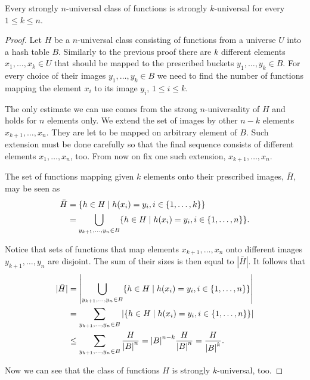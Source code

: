 \begin{remark}
\label{remark-n-to-k}
Every strongly $n$-universal class of functions is strongly $k$-universal for every $1 \leq k \leq n$.
\end{remark}
\begin{proof}
Let $H$ be a $n$-universal class consisting of functions from a universe $U$ into a hash table $B$. Similarly to the previous proof there are $k$ different elements $x_1, \dots, x_k \in U$ that should be mapped to the prescribed buckets $y_1, \dots, y_k \in B$. For every choice of their images $y_1, \dots, y_k \in B$ we need to find the number of functions mapping the element $x_i$ to its image $y_i$, $1 \leq i \leq k$. 

The only estimate we can use comes from the strong $n$-universality of $H$ and holds for $n$ elements only. We extend the set of images by other $n - k$ elements $x_{k + 1}, \dots, x_n$. They are let to be mapped on arbitrary element of $B$. Such extension must be done carefully so that the final sequence consists of different elements $x_1, \dots, x_n$, too. From now on fix one such extension, $x_{k + 1}, \dots, x_n$.

The set of functions mapping given $k$ elements onto their prescribed images, $\bar H$, may be seen as
\[
\begin{split}
\bar{H}	& = \lbrace h \in H \mid h(x_i) = y_i, i \in \lbrace 1, \dots, k \rbrace \rbrace \\
	& = \displaystyle \bigcup_{y_{k+1}, \dots, y_n \in B} \lbrace h \in H \mid h(x_i) = y_i, i \in \lbrace 1, \dots, n \rbrace \rbrace \text{.}
\end{split}
\]

Notice that sets of functions that map elements $x_{k + 1}, \dots, x_n$ onto different images $y_{k + 1}, \dots, y_n$ are disjoint. The sum of their sizes is then equal to $|\bar H|$. It follows that
\[
\begin{split}
|\bar H|& = \left| \displaystyle \bigcup_{y_{k+1}, \dots, y_n \in B} \lbrace h \in H \mid h(x_i) = y_i, i \in \lbrace 1, \dots, n \rbrace \rbrace \right| \\
	& = \displaystyle \sum_{y_{k+1}, \dots, y_n \in B} \left| \lbrace h \in H \mid h(x_i) = y_i, i \in \lbrace 1, \dots, n \rbrace \rbrace \right| \\
	& \leq \displaystyle \sum_{y_{k+1}, \dots, y_n \in B} \frac{H}{{|B|}^{n}} = {|B|}^{n - k} \frac{H}{{|B|}^{n}} = \frac{H}{{|B|}^{k}} \text{.}
\end{split}
\]

Now we can see that the class of functions $H$ is strongly $k$-universal, too.
\end{proof}

